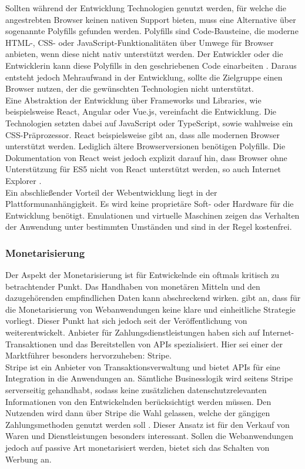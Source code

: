\documentclass[a4paper]{scrartcl}
\begin{document}
Sollten während der Entwicklung Technologien genutzt werden, für welche die angestrebten Browser keinen nativen Support bieten, muss eine Alternative über sogenannte Polyfills gefunden werden. Polyfills sind Code-Bausteine, die moderne HTML-, CSS- oder JavaScript-Funktionalitäten über Umwege für Browser anbieten, wenn diese nicht nativ unterstützt werden. Der Entwickler oder die Entwicklerin kann diese Polyfills in den geschriebenen Code einarbeiten \autocite{Polyfills}. Daraus entsteht jedoch Mehraufwand in der Entwicklung, sollte die Zielgruppe einen Browser nutzen, der die gewünschten Technologien nicht unterstützt. \\

Eine Abstraktion der Entwicklung über Frameworks und Libraries, wie beispielsweise React, Angular oder Vue.js, vereinfacht die Entwicklung. Die Technologien setzten dabei auf JavaScript oder TypeScript, sowie wahlweise ein CSS-Präprozessor. React beispielsweise gibt an, dass alle modernen Browser unterstützt werden. Lediglich ältere Browserversionen benötigen Polyfills. Die Dokumentation von React weist jedoch explizit darauf hin, dass Browser ohne Unterstützung für ES5 nicht von React unterstützt werden, so auch Internet Explorer \autocite{ReactDOM}. \\

Ein abschließender Vorteil der Webentwicklung liegt in der Plattformunanhängigkeit. Es wird keine proprietäre Soft- oder Hardware für die Entwicklung benötigt. Emulationen und virtuelle Maschinen zeigen das Verhalten der Anwendung unter bestimmten Umständen und sind in der Regel kostenfrei. \\

\subsubsection{Monetarisierung}
Der Aspekt der Monetarisierung ist für Entwickelnde ein oftmals kritisch zu betrachtender Punkt. Das Handhaben von monetären Mitteln und den dazugehörenden empfindlichen Daten kann abschreckend wirken. \textcite[28]{Jobe} gibt an, dass für die Monetarisierung von Webanwendungen keine klare und einheitliche Strategie vorliegt. Dieser Punkt hat sich jedoch seit der Veröffentlichung von \textcite{Jobe} weiterentwickelt. Anbieter für Zahlungsdienstleistungen haben sich auf Internet-Transaktionen und das Bereitstellen von APIs spezialisiert. Hier sei einer der Marktführer besonders hervorzuheben: Stripe. \\
Stripe ist ein Anbieter von Transaktionsverwaltung und bietet APIs für eine Integration in die Anwendungen an. Sämtliche Businesslogik wird seitens Stripe serverseitig gehandhabt, sodass keine zusätzlichen datenschutzrelevanten Informationen von den Entwickelnden berücksichtigt werden müssen. Den Nutzenden wird dann über Stripe die Wahl gelassen, welche der gängigen Zahlungsmethoden genutzt werden soll \autocite{Stripe}. Dieser Ansatz ist für den Verkauf von Waren und Dienstleistungen besonders interessant. Sollen die Webanwendungen jedoch auf passive Art monetarisiert werden, bietet sich das Schalten von Werbung an. \\
\end{document}
